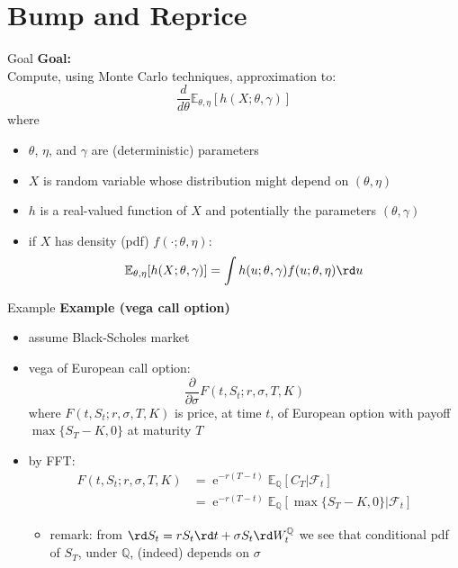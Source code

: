 \documentclass[pdf, handout]{beamer}
\newcommand{\e}{\operatorname{e}}
\begin{document}
\section{Bump and Reprice}

\begin{frame}{Goal}
\textbf{Goal:} \\
Compute, using Monte Carlo techniques, approximation to:
$$
\frac{d}{d\theta} \mathbb{E}_{\theta,\eta} [ h(X; \theta, \gamma)]
$$
where
\begin{itemize}
\item $\theta$, $\eta$, and $\gamma$ are (deterministic) parameters
\item  $X$ is random variable whose distribution might depend on $(\theta,\eta)$
\item  $h$ is a real-valued function of $X$ and potentially the parameters
$(\theta,\gamma)$
\item if $X$ has density (pdf) $f(\cdot;\theta,\eta)$:
\[
 \mathbb{E}_{\theta,\eta} [ h(X; \theta, \gamma)]
 = \int  h(u; \theta, \gamma)  f(u;\theta,\eta) \rd u
\]
\end{itemize}
\end{frame}

\begin{frame}{Example}
\textbf{Example (vega call option)}
\begin{itemize}
\item assume Black-Scholes market
\item vega of European call option: 
\[
\frac{\partial}{\partial\sigma} F(t,S_t;r,\sigma,T,K)
\]
where $F(t,S_t;r,\sigma,T,K)$ is price, at time $t$, of European option with payoff $\max\{S_T-K,0\}$ at maturity $T$ 
\item by FFT:
\begin{align*}
F(t,S_t;r,\sigma,T,K) 
&=  \e^{-r(T-t)}  
\mathbb{E}_{\mathbb{Q}}\left[ C_T        | \mathcal{F}_t   \right]
\\
&=  \e^{-r(T-t)}  
\mathbb{E}_{\mathbb{Q}}\left[\max\{S_T-K,0\}        | \mathcal{F}_t    \right]
\end{align*}
\begin{itemize}
\item remark: from $\rd S_t = r S_t \rd t + \sigma S_t \rd W_t^{\mathbb{Q}}$
we see that conditional pdf of $S_T$, under $\mathbb{Q}$, (indeed) depends on $\sigma$
\end{itemize}
\end{itemize}
\end{frame}
\end{document}
